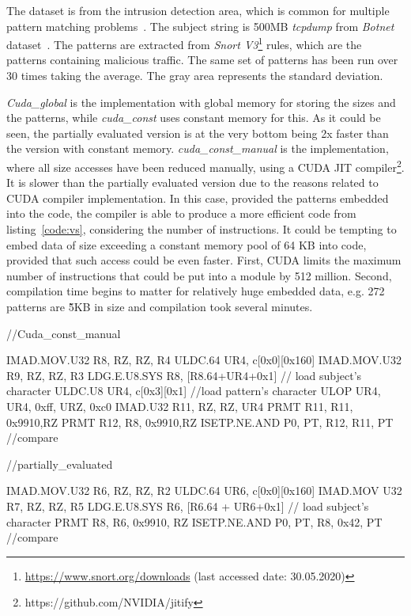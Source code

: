 The dataset is from the intrusion detection area, which is common for multiple pattern matching problems~\cite{Aho-Corasick}. The subject string is 500MB \emph{tcpdump} from \emph{Botnet} dataset~\cite{Ring_2019}. The patterns are extracted from \emph{Snort V3}\footnote{\url{https://www.snort.org/downloads} (last accessed date: 30.05.2020)} rules, which are the patterns containing malicious traffic. The same set of patterns has been run over 30 times taking the average. The gray area represents the standard deviation.

\emph{Cuda\_global} is the implementation with global memory for storing the sizes and the patterns, while \emph{cuda\_const} uses constant memory for this. As it could be seen, the partially evaluated version is at the very bottom being 2x faster than the version with constant memory. \emph{cuda\_const\_manual} is the implementation, where all size accesses have been reduced manually, using a CUDA JIT compiler\footnote{https://github.com/NVIDIA/jitify}. It is slower than the partially evaluated version due to the reasons related to CUDA compiler implementation. In this case, provided the patterns embedded into the code, the compiler is able to produce a more efficient code from listing~\ref{code:vs}, considering the number of instructions. It could be tempting to embed data of size exceeding a constant memory pool of 64 KB into code, provided that such access could be even faster. First, CUDA limits the maximum number of instructions that could be put into a module by 512 million. Second, compilation time begins to matter for relatively huge embedded data, e.g. 272 patterns are \~5KB in size and compilation took several minutes.

\begin{code}[language=C,caption=Cuda\_const\_manual vs partially\_evaluated,label=code:vs,escapechar=!]
    //Cuda_const_manual

IMAD.MOV.U32 R8, RZ, RZ, R4 
ULDC.64 UR4, c[0x0][0x160]
IMAD.MOV.U32 R9, RZ, RZ, R3
LDG.E.U8.SYS R8, [R8.64+UR4+0x1] // load subject's character
ULDC.U8 UR4, c[0x3][0x1] //load pattern's character
ULOP UR4, UR4, 0xff, URZ, 0xc0
IMAD.U32 R11, RZ, RZ, UR4
PRMT R11, R11, 0x9910,RZ
PRMT R12, R8, 0x9910,RZ
ISETP.NE.AND P0, PT, R12, R11, PT //compare

    //partially_evaluated

IMAD.MOV.U32 R6, RZ, RZ, R2 
ULDC.64 UR6, c[0x0][0x160] 
IMAD.MOV U32 R7, RZ, RZ, R5 
LDG.E.U8.SYS R6, [R6.64 + UR6+0x1] // load subject's character
PRMT R8, R6, 0x9910, RZ
ISETP.NE.AND P0, PT, R8, 0x42, PT //compare

\end{code}

